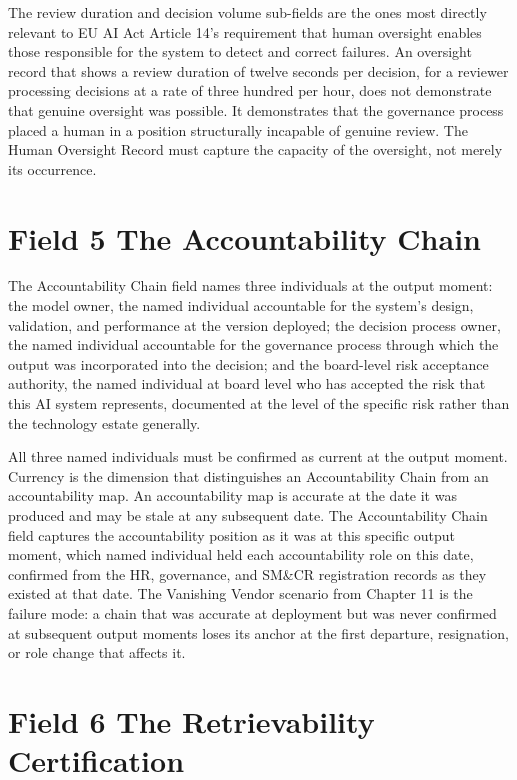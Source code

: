 The review duration and decision volume sub-fields are the ones most directly relevant to EU AI Act Article 14's requirement that human oversight enables those responsible for the system to detect and correct failures. An oversight record that shows a review duration of twelve seconds per decision, for a reviewer processing decisions at a rate of three hundred per hour, does not demonstrate that genuine oversight was possible. It demonstrates that the governance process placed a human in a position structurally incapable of genuine review. The Human Oversight Record must capture the capacity of the oversight, not merely its occurrence.

\section{Field 5 The Accountability Chain}

The Accountability Chain field names three individuals at the output moment: the model owner, the named individual accountable for the system's design, validation, and performance at the version deployed; the decision process owner, the named individual accountable for the governance process through which the output was incorporated into the decision; and the board-level risk acceptance authority, the named individual at board level who has accepted the risk that this AI system represents, documented at the level of the specific risk rather than the technology estate generally.

All three named individuals must be confirmed as current at the output moment. Currency is the dimension that distinguishes an Accountability Chain from an accountability map. An accountability map is accurate at the date it was produced and may be stale at any subsequent date. The Accountability Chain field captures the accountability position as it was at this specific output moment, which named individual held each accountability role on this date, confirmed from the HR, governance, and SM\&CR registration records as they existed at that date. The Vanishing Vendor scenario from Chapter 11 is the failure mode: a chain that was accurate at deployment but was never confirmed at subsequent output moments loses its anchor at the first departure, resignation, or role change that affects it.

\section{Field 6 The Retrievability Certification}

